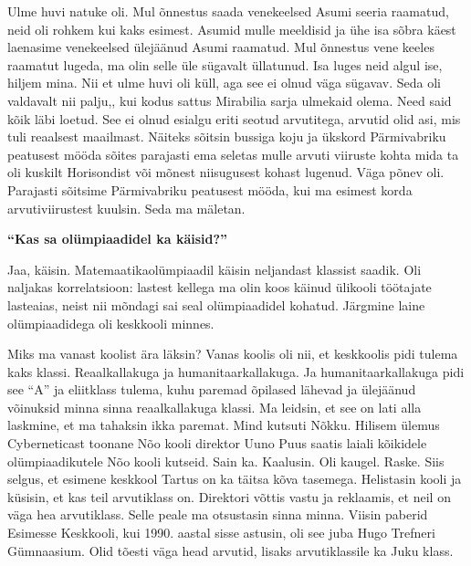 Ulme huvi natuke oli. Mul õnnestus saada venekeelsed Asumi seeria raamatud, neid oli rohkem kui kaks esimest. Asumid mulle meeldisid ja ühe isa sõbra käest laenasime venekeelsed ülejäänud Asumi raamatud. Mul õnnestus vene keeles raamatut lugeda, ma olin selle üle sügavalt üllatunud. Isa luges neid algul ise, hiljem mina. Nii et ulme huvi oli küll, aga see ei olnud väga sügavav. Seda oli valdavalt nii palju,, kui kodus sattus Mirabilia sarja ulmekaid olema. Need said kõik läbi loetud. See ei olnud esialgu eriti seotud arvutitega, arvutid olid asi, mis tuli reaalsest maailmast. Näiteks sõitsin bussiga koju ja ükskord Pärmivabriku peatusest mööda sõites parajasti ema seletas mulle arvuti viiruste kohta mida ta oli kuskilt Horisondist või mõnest niisugusest kohast lugenud. Väga põnev oli. Parajasti sõitsime Pärmivabriku peatusest mööda, kui ma esimest korda arvutiviirustest kuulsin. Seda ma mäletan. 

\textbf{\enquote{Kas sa olümpiaadidel ka käisid?}}

Jaa, käisin. Matemaatikaolümpiaadil käisin neljandast klassist saadik. Oli naljakas korrelatsioon: lastest kellega ma olin koos käinud ülikooli töötajate lasteaias, neist nii mõndagi sai seal olümpiaadidel kohatud. Järgmine laine olümpiaadidega oli keskkooli minnes. 

Miks ma vanast koolist ära läksin? Vanas koolis oli nii, et keskkoolis pidi tulema kaks klassi. Reaalkallakuga ja humanitaarkallakuga. Ja humanitaarkallakuga pidi see \enquote{A} ja eliitklass tulema, kuhu paremad õpilased lähevad ja ülejäänud võinuksid minna sinna reaalkallakuga klassi. Ma leidsin, et see on lati alla laskmine, et ma tahaksin ikka paremat. Mind kutsuti Nõkku. Hilisem ülemus Cyberneticast toonane Nõo kooli direktor Uuno Puus saatis laiali kõikidele olümpiaadikutele Nõo kooli kutseid. Sain ka. Kaalusin. Oli kaugel. Raske. Siis selgus, et esimene keskkool Tartus on ka täitsa kõva tasemega. Helistasin kooli ja küsisin, et kas teil arvutiklass on. Direktori võttis vastu ja reklaamis, et neil on väga hea arvutiklass. Selle peale ma otsustasin sinna minna. Viisin paberid Esimesse Keskkooli, kui 1990. aastal sisse astusin, oli see juba Hugo Trefneri Gümnaasium. Olid tõesti väga head arvutid, lisaks arvutiklassile ka Juku klass. 

